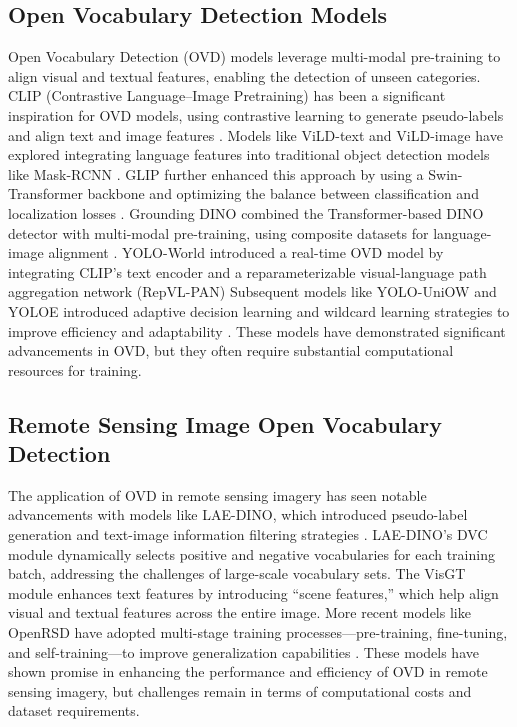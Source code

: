 \documentclass{article}
\begin{document}
\subsection{Open Vocabulary Detection Models}
Open Vocabulary Detection (OVD) models leverage multi-modal  
pre-training to align visual and textual features, enabling  
the detection of unseen categories.  
CLIP (Contrastive Language–Image Pretraining) has been a  
significant inspiration for OVD models, using contrastive  
learning to generate pseudo-labels and align text and  
image features \cite{radford2021learning}.  
Models like ViLD-text and ViLD-image have explored integrating  
language features into traditional object detection models  
like Mask-RCNN \cite{gu2021open}.  
GLIP further enhanced this approach by using a Swin-Transformer  
backbone and optimizing the balance between classification  
and localization losses \cite{li2022grounded,liu2021swin,zhang2022glipv2}.  
Grounding DINO combined the Transformer-based DINO detector  
with multi-modal pre-training, using composite datasets for  
language-image alignment \cite{liu2024grounding}.  
YOLO-World introduced a real-time OVD model by integrating  
CLIP’s text encoder and a reparameterizable visual-language  
path aggregation network (RepVL-PAN) \cite{cheng2024yolo}  
Subsequent models like YOLO-UniOW and YOLOE introduced adaptive  
decision learning and wildcard learning strategies to improve  
efficiency and adaptability \cite{liu2024yolo,sun2025yolo}.  
These models have demonstrated significant advancements in OVD,  
but they often require substantial computational resources for training.

\subsection{Remote Sensing Image Open Vocabulary Detection}
The application of OVD in remote sensing imagery has seen  
notable advancements with models like LAE-DINO, which introduced  
pseudo-label generation and text-image information filtering  
strategies \cite{pan2025locate}.  
LAE-DINO’s DVC module dynamically selects positive and negative  
vocabularies for each training batch, addressing the challenges  
of large-scale vocabulary sets.  
The VisGT module enhances text features by introducing “scene  
features,” which help align visual and textual features across  
the entire image.  
More recent models like OpenRSD have adopted multi-stage training  
processes—pre-training, fine-tuning, and self-training—to improve  
generalization capabilities \cite{huang2025openrsd}.  
These models have shown promise in enhancing the performance and  
efficiency of OVD in remote sensing imagery, but challenges remain  
in terms of computational costs and dataset requirements.
\end{document}
